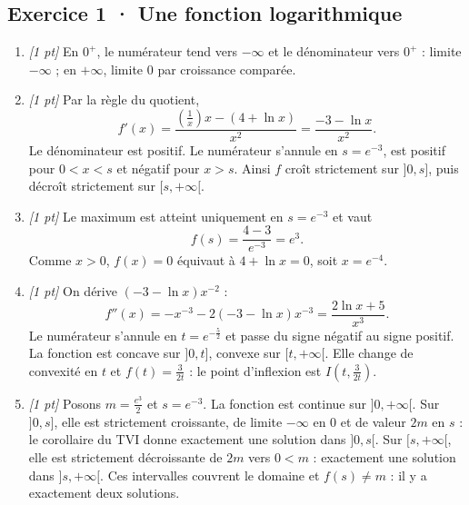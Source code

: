 \subsection*{Exercice 1 · Une fonction logarithmique}\begin{enumerate}

\item \textit{[1 pt]} En $0^+$, le numérateur tend vers $-\infty$ et le dénominateur vers $0^+$ : limite $-\infty$ ; en $+\infty$, limite $0$ par croissance comparée.

\item \textit{[1 pt]} Par la règle du quotient,
\[f'(x)=\frac{(\frac{1}{x})x-(4+\ln x)}{x^2}=\frac{-3-\ln x}{x^2}.\]
Le dénominateur est positif. Le numérateur s'annule en $s=e^{-3}$, est positif pour $0<x<s$ et négatif pour $x>s$. Ainsi $f$ croît strictement sur $]0,s]$, puis décroît strictement sur $[s,+\infty[$.

\item \textit{[1 pt]} Le maximum est atteint uniquement en $s=e^{-3}$ et vaut
\[f(s)=\frac{4- 3}{e^{-3}}=e^{3}.\]
Comme $x>0$, $f(x)=0$ équivaut à $4+\ln x=0$, soit $x=e^{-4}$.

\item \textit{[1 pt]} On dérive $(-3-\ln x)x^{-2}$ :
\[f''(x)=-x^{-3}-2(-3-\ln x)x^{-3}=\frac{2\ln x+5}{x^3}.\]
Le numérateur s'annule en $t=e^{-\frac{5}{2}}$ et passe du signe négatif au signe positif. La fonction est concave sur $]0,t]$, convexe sur $[t,+\infty[$. Elle change de convexité en $t$ et $f(t)=\frac{3}{2t}$ : le point d'inflexion est $I(t,\frac{3}{2t})$.

\item \textit{[1 pt]} Posons $m=\frac{e^{3}}{2}$ et $s=e^{-3}$. La fonction est continue sur $]0,+\infty[$. Sur $]0,s]$, elle est strictement croissante, de limite $-\infty$ en $0$ et de valeur $2m$ en $s$ : le corollaire du TVI donne exactement une solution dans $]0,s[$. Sur $[s,+\infty[$, elle est strictement décroissante de $2m$ vers $0<m$ : exactement une solution dans $]s,+\infty[$. Ces intervalles couvrent le domaine et $f(s)\ne m$ : il y a exactement deux solutions.

\end{enumerate}

